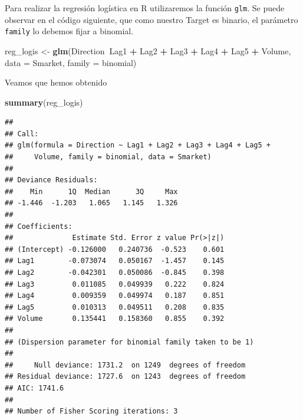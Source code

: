 \documentclass[]{book}
\newenvironment{Shaded}{\begin{snugshade}}{\end{snugshade}}
\newcommand{\DataTypeTok}[1]{\textcolor[rgb]{0.13,0.29,0.53}{#1}}
\newcommand{\DecValTok}[1]{\textcolor[rgb]{0.00,0.00,0.81}{#1}}
\newcommand{\KeywordTok}[1]{\textcolor[rgb]{0.13,0.29,0.53}{\textbf{#1}}}
\newcommand{\NormalTok}[1]{#1}
\newcommand{\OperatorTok}[1]{\textcolor[rgb]{0.81,0.36,0.00}{\textbf{#1}}}
\newcommand{\StringTok}[1]{\textcolor[rgb]{0.31,0.60,0.02}{#1}}
\begin{document}
\begin{Shaded}
\end{Shaded}

Para realizar la regresión logística en R utilizaremos la función \texttt{glm}.
Se puede observar en el código siguiente, que como nuestro Target es binario, el parámetro \texttt{family} lo debemos fijar a binomial.

\begin{Shaded}
\begin{Highlighting}[]
\NormalTok{reg_logis <-}\StringTok{ }\KeywordTok{glm}\NormalTok{(Direction}\OperatorTok{~}\NormalTok{Lag1 }\OperatorTok{+}\StringTok{ }\NormalTok{Lag2 }\OperatorTok{+}\StringTok{ }\NormalTok{Lag3 }\OperatorTok{+}\StringTok{ }\NormalTok{Lag4 }\OperatorTok{+}\StringTok{ }\NormalTok{Lag5 }\OperatorTok{+}\StringTok{ }\NormalTok{Volume,}
                 \DataTypeTok{data =}\NormalTok{ Smarket,}
                 \DataTypeTok{family =}\NormalTok{ binomial)}
\end{Highlighting}
\end{Shaded}

Veamos que hemos obtenido

\begin{Shaded}
\begin{Highlighting}[]
\KeywordTok{summary}\NormalTok{(reg_logis)}
\end{Highlighting}
\end{Shaded}

\begin{verbatim}
## 
## Call:
## glm(formula = Direction ~ Lag1 + Lag2 + Lag3 + Lag4 + Lag5 + 
##     Volume, family = binomial, data = Smarket)
## 
## Deviance Residuals: 
##    Min      1Q  Median      3Q     Max  
## -1.446  -1.203   1.065   1.145   1.326  
## 
## Coefficients:
##              Estimate Std. Error z value Pr(>|z|)
## (Intercept) -0.126000   0.240736  -0.523    0.601
## Lag1        -0.073074   0.050167  -1.457    0.145
## Lag2        -0.042301   0.050086  -0.845    0.398
## Lag3         0.011085   0.049939   0.222    0.824
## Lag4         0.009359   0.049974   0.187    0.851
## Lag5         0.010313   0.049511   0.208    0.835
## Volume       0.135441   0.158360   0.855    0.392
## 
## (Dispersion parameter for binomial family taken to be 1)
## 
##     Null deviance: 1731.2  on 1249  degrees of freedom
## Residual deviance: 1727.6  on 1243  degrees of freedom
## AIC: 1741.6
## 
## Number of Fisher Scoring iterations: 3
\end{verbatim}
\end{document}
